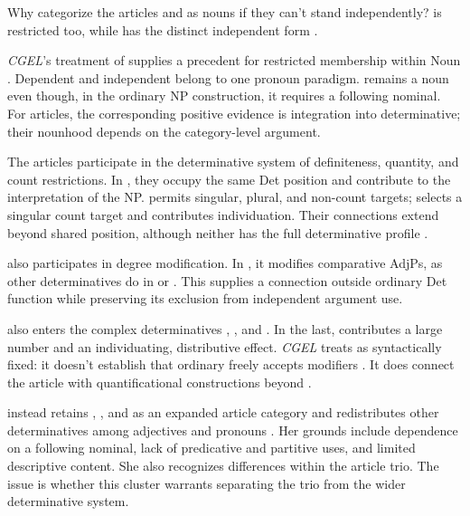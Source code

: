 \documentclass[12pt]{article}
\begin{document}
Why categorize the articles  and  as nouns if they can't stand independently?  is restricted too, while  has the distinct independent form  \citep[371--372, 410--411]{huddleston2002}.

\textit{CGEL}'s treatment of  supplies a precedent for restricted membership within Noun \citep[470--471]{huddleston2002}. Dependent  and independent  belong to one pronoun paradigm.  remains a noun even though, in the ordinary NP construction, it requires a following nominal. For articles, the corresponding positive evidence is integration into determinative; their nounhood depends on the category-level argument.

The articles participate in the determinative system of definiteness, quantity, and count restrictions. In , they occupy the same Det position and contribute to the interpretation of the NP.  permits singular, plural, and non-count targets;  selects a singular count target and contributes individuation. Their connections extend beyond shared position, although neither has the full determinative profile \citep[368--373]{huddleston2002}.

 also participates in degree modification. In , it modifies comparative AdjPs, as other determinatives do in  or  \citep[1131--1132, 1135--1136]{huddleston2002}. This supplies a connection outside ordinary Det function while preserving its exclusion from independent argument use.

 also enters the complex determinatives , , and . In the last,  contributes a large number and  an individuating, distributive effect. \textit{CGEL} treats  as syntactically fixed: it doesn't establish that ordinary  freely accepts modifiers \citep[392--394]{huddleston2002}. It does connect the article with quantificational constructions beyond .

\textcite[153--158]{spinillo2004reconceptualising} instead retains , , and  as an expanded article category and redistributes other determinatives among adjectives and pronouns \citep[194--195]{spinillo2004reconceptualising}. Her grounds include dependence on a following nominal, lack of predicative and partitive uses, and limited descriptive content. She also recognizes differences within the article trio. The issue is whether this cluster warrants separating the trio from the wider determinative system.
\end{document}
